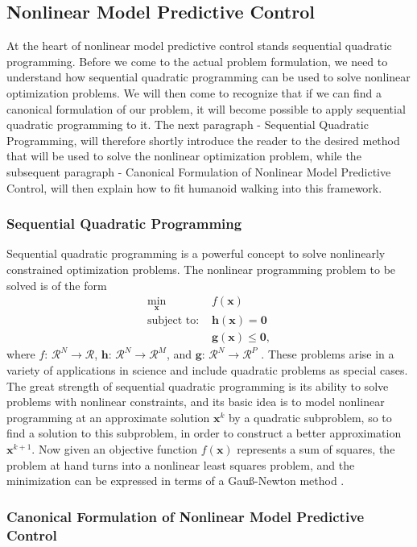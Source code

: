 \subsection{Nonlinear Model Predictive Control}
\label{sec::312_nmpc}
At the heart of nonlinear model predictive control stands sequential quadratic programming. Before we come to the actual problem formulation, we need to understand how sequential quadratic programming can be used to solve nonlinear optimization problems. We will then come to recognize that if we can find a canonical formulation of our problem, it will become possible to apply sequential quadratic programming to it. The next paragraph - Sequential Quadratic Programming, will therefore shortly introduce the reader to the desired method that will be used to solve the  nonlinear optimization problem, while the subsequent paragraph - Canonical Formulation of Nonlinear Model Predictive Control, will then explain how to fit humanoid walking into this framework.
\subsubsection{Sequential Quadratic Programming}
Sequential quadratic programming is a powerful concept to solve nonlinearly constrained optimization problems. The nonlinear programming problem to be solved is of the form
\begin{align}
	\min_{\bm{x}}\, &f(\bm{x})\\
	\text{subject to: } &\bm{h}(\bm{x}) = \bm{0}\\
	&\bm{g}(\bm{x}) \leq \bm{0},
\end{align}
where $f:\,\mathcal{R}^N\rightarrow\mathcal{R}$, $\bm{h}:\,\mathcal{R}^N\rightarrow\mathcal{R}^M$, and $\bm{g}:\,\mathcal{R}^N\rightarrow\mathcal{R}^P$ \cite{boggs1995sequential}. These problems arise in a variety of applications in science and include quadratic problems as special cases. The great strength of sequential quadratic programming is its ability to solve problems with nonlinear constraints, and its basic idea is to model nonlinear programming at an approximate solution $\bm{x}^k$ by a quadratic subproblem, so to find a solution to this subproblem, in order to construct a better approximation $\bm{x}^{k+1}$. Now given an objective function $f(\bm{x})$ represents a sum of squares, the problem at hand turns into a nonlinear least squares problem, and the minimization can be expressed in terms of a Gauß-Newton method \cite{schittkowski1988solving}. 
\subsubsection{Canonical Formulation of Nonlinear Model Predictive Control}
\cite{kajita2003biped} %
\cite{herdt2010online} %
\cite{herdt2010walking} %
\cite{naveau2016reactive} %